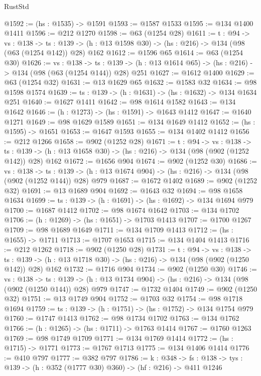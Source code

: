 \begin{lexlean}{RustStd}
\begin{coremodule}
@1592 := (hs : @1535) -> @1591
@1593 := @1587 @1533
@1595 := @134 @1400 @1411
@1596 := @212 @1270
@1598 := @63 (@1254 @28)
@1611 := {t : @94} ->
  {vs : @138} ->
  {ts : @139} -> (h : @13 @1598 @30) -> (hs : @216) -> @134 (@98 (@63 (@1254 @142)) @28) @162
@1612 := @1596 @65
@1614 := @63 (@1254 @30)
@1626 := {vs : @138} ->
  {ts : @139} -> (h : @13 @1614 @65) -> (hs : @216) -> @134 (@98 (@63 (@1254 @144)) @28) @251
@1627 := @1612 @1400
@1629 := @63 (@1254 @32)
@1631 := @13 @1629 @65
@1632 := @1583 @32
@1634 := @98 @1598 @1574
@1639 := {ts : @139} -> (h : @1631) -> (hs : @1632) -> @134 @1634 @251
@1640 := @1627 @1411
@1642 := @98 @1614 @1582
@1643 := @134 @1642
@1646 := (h : @1273) -> (hs : @1591) -> @1643 @1412
@1647 := @1640 @1271
@1649 := @98 @1629 @1589
@1651 := @134 @1649 @1412
@1652 := (hs : @1595) -> @1651
@1653 := @1647 @1593
@1655 := @134 @1402 @1412
@1656 := @212 @1266
@1658 := @902 (@1252 @28)
@1671 := {t : @94} ->
  {vs : @138} ->
  {ts : @139} -> (h : @13 @1658 @30) -> (hs : @216) -> @134 (@98 (@902 (@1252 @142)) @28) @162
@1672 := @1656 @904
@1674 := @902 (@1252 @30)
@1686 := {vs : @138} ->
  {ts : @139} -> (h : @13 @1674 @904) -> (hs : @216) -> @134 (@98 (@902 (@1252 @144)) @28) @979
@1687 := @1672 @1402
@1689 := @902 (@1252 @32)
@1691 := @13 @1689 @904
@1692 := @1643 @32
@1694 := @98 @1658 @1634
@1699 := {ts : @139} -> (h : @1691) -> (hs : @1692) -> @134 @1694 @979
@1700 := @1687 @1412
@1702 := @98 @1674 @1642
@1703 := @134 @1702
@1706 := (h : @1269) -> (hs : @1651) -> @1703 @1413
@1707 := @1700 @1267
@1709 := @98 @1689 @1649
@1711 := @134 @1709 @1413
@1712 := (hs : @1655) -> @1711
@1713 := @1707 @1653
@1715 := @134 @1404 @1413
@1716 := @212 @1262
@1718 := @902 (@1250 @28)
@1731 := {t : @94} ->
  {vs : @138} ->
  {ts : @139} -> (h : @13 @1718 @30) -> (hs : @216) -> @134 (@98 (@902 (@1250 @142)) @28) @162
@1732 := @1716 @904
@1734 := @902 (@1250 @30)
@1746 := {vs : @138} ->
  {ts : @139} -> (h : @13 @1734 @904) -> (hs : @216) -> @134 (@98 (@902 (@1250 @144)) @28) @979
@1747 := @1732 @1404
@1749 := @902 (@1250 @32)
@1751 := @13 @1749 @904
@1752 := @1703 @32
@1754 := @98 @1718 @1694
@1759 := {ts : @139} -> (h : @1751) -> (hs : @1752) -> @134 @1754 @979
@1760 := @1747 @1413
@1762 := @98 @1734 @1702
@1763 := @134 @1762
@1766 := (h : @1265) -> (hs : @1711) -> @1763 @1414
@1767 := @1760 @1263
@1769 := @98 @1749 @1709
@1771 := @134 @1769 @1414
@1772 := (hs : @1715) -> @1771
@1773 := @1767 @1713
@1775 := @134 @1406 @1414
@1776 := @410 @797
@1777 := @382 @797
@1786 := {k : @348} ->
  {fs : @138} -> {tys : @139} -> (h : @352 (@1777 @30) @360) -> (hf : @216) -> @411 @1246

\end{coremodule}
\end{lexlean}

